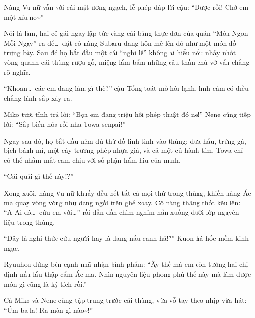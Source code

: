 \documentclass[../main.tex]{subfiles}
\begin{document}
Nàng Vu nữ vẫn với cái mặt ương ngạch, lễ phép đáp lời cậu: ``Được rồi! Chờ em một xíu ne\~{}''

Nói là làm, hai cô gái ngay lập tức căng cái bảng thực đơn của quán ``Món Ngon Mỗi Ngày'' ra để\dots\ đặt cô nàng Subaru đang hôn mê lên đó như một món đồ trưng bày. Sau đó họ bắt đầu một cái ``nghi lễ'' không ai hiểu nổi: nhảy nhót vòng quanh cái thùng rượu gỗ, miệng lẩm bẩm những câu thần chú vớ vẩn chẳng rõ nghĩa.

``Khoan\dots\ các em đang làm gì thế?'' cậu Tổng toát mồ hôi lạnh, linh cảm có điều chẳng lành sắp xảy ra.

Miko tươi tỉnh trả lời: ``Bọn em đang triệu hồi phép thuật đó ne!'' Nene cũng tiếp lời: ``Sắp biến hóa rồi nha Towa-senpai!''

Ngay sau đó, họ bắt đầu ném đủ thứ đồ linh tinh vào thùng: dưa hấu, trứng gà, bịch bánh mì, một cây trượng phép nhựa giả, và cả một củ hành tím. Towa chỉ có thể nhắm mắt cam chịu với số phận hẩm hiu của mình.

``Cái quái gì thế này!?''

Xong xuôi, nàng Vu nữ khuấy đều hết tất cả mọi thứ trong thùng, khiến nàng Ác ma quay vòng vòng như đang ngồi trên ghế xoay. Cô nàng thảng thốt kêu lên: ``A-Ai đó\dots\ cứu em với\dots'' rồi dần dần chìm nghỉm hẳn xuống dưới lớp nguyên liệu trong thùng.

``Đây là nghi thức cứu người hay là đang nấu canh hả!?'' Kuon há hốc mồm kinh ngạc.

Ryuuhou đứng bên cạnh nhã nhặn bình phẩm: ``Ấy thế mà em còn tưởng hai chị định nấu lẩu thập cẩm Ác ma. Nhìn nguyên liệu phong phú thế này mà làm được món gì cũng là kỳ tích rồi.''

Cả Miko và Nene cùng tập trung trước cái thùng, vừa vỗ tay theo nhịp vừa hát: ``Úm-ba-la! Ra món gì nào\~{}!''
\end{document}
